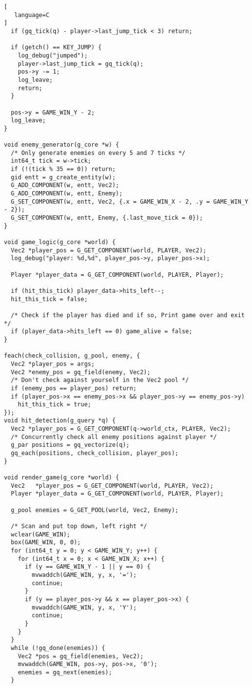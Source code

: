 \begin{lstlisting}[
   language=C
]
  if (gq_tick(q) - player->last_jump_tick < 3) return;

  if (getch() == KEY_JUMP) {
    log_debug("jumped");
    player->last_jump_tick = gq_tick(q);
    pos->y -= 1;
    log_leave;
    return;
  }

  pos->y = GAME_WIN_Y - 2;
  log_leave;
}

void enemy_generator(g_core *w) {
  /* Only generate enemies on every 5 and 7 ticks */
  int64_t tick = w->tick;
  if (!(tick % 35 == 0)) return;
  gid entt = g_create_entity(w);
  G_ADD_COMPONENT(w, entt, Vec2);
  G_ADD_COMPONENT(w, entt, Enemy);
  G_SET_COMPONENT(w, entt, Vec2, {.x = GAME_WIN_X - 2, .y = GAME_WIN_Y - 2});
  G_SET_COMPONENT(w, entt, Enemy, {.last_move_tick = 0});
}

void game_logic(g_core *world) {
  Vec2 *player_pos = G_GET_COMPONENT(world, PLAYER, Vec2);
  log_debug("player: %d,%d", player_pos->y, player_pos->x);

  Player *player_data = G_GET_COMPONENT(world, PLAYER, Player);

  if (hit_this_tick) player_data->hits_left--;
  hit_this_tick = false;

  /* Check if the player has died and if so, Print game over and exit */
  if (player_data->hits_left == 0) game_alive = false;
}

feach(check_collision, g_pool, enemy, {
  Vec2 *player_pos = args;
  Vec2 *enemy_pos = gq_field(enemy, Vec2);
  /* Don't check against yourself in the Vec2 pool */
  if (enemy_pos == player_pos) return;
  if (player_pos->x == enemy_pos->x && player_pos->y == enemy_pos->y)
    hit_this_tick = true;
});
void hit_detection(g_query *q) {
  Vec2 *player_pos = G_GET_COMPONENT(q->world_ctx, PLAYER, Vec2);
  /* Concurrently check all enemy positions against player */
  g_par positions = gq_vectorize(q);
  gq_each(positions, check_collision, player_pos);
}

void render_game(g_core *world) {
  Vec2   *player_pos = G_GET_COMPONENT(world, PLAYER, Vec2);
  Player *player_data = G_GET_COMPONENT(world, PLAYER, Player);

  g_pool enemies = G_GET_POOL(world, Vec2, Enemy);

  /* Scan and put top down, left right */
  wclear(GAME_WIN);
  box(GAME_WIN, 0, 0);
  for (int64_t y = 0; y < GAME_WIN_Y; y++) {
    for (int64_t x = 0; x < GAME_WIN_X; x++) {
      if (y == GAME_WIN_Y - 1 || y == 0) {
        mvwaddch(GAME_WIN, y, x, '=');
        continue;
      }
      if (y == player_pos->y && x == player_pos->x) {
        mvwaddch(GAME_WIN, y, x, 'Y');
        continue;
      }
    }
  }
  while (!gq_done(enemies)) {
    Vec2 *pos = gq_field(enemies, Vec2);
    mvwaddch(GAME_WIN, pos->y, pos->x, '0');
    enemies = gq_next(enemies);
  }


\end{lstlisting}
